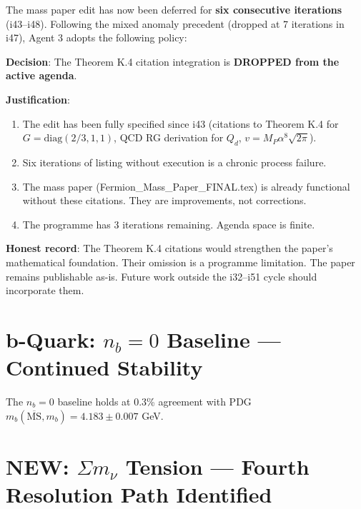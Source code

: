 \documentclass[11pt,a4paper]{article}
\newcommand{\NEW}{\textcolor{dfdblue}{\textbf{NEW}}}
\begin{document}
\begin{tcolorbox}[colback=red!5!white, colframe=red!60!black,
  title={MASS PAPER EDIT: SIX Iterations Deferred (i43--i48) --- DROP DECISION}]

The mass paper edit has now been deferred for \textbf{six consecutive iterations} (i43--i48). Following the mixed anomaly precedent (dropped at 7 iterations in i47), Agent 3 adopts the following policy:

\textbf{Decision}: The Theorem K.4 citation integration is \textbf{DROPPED from the active agenda}.

\textbf{Justification}:
\begin{enumerate}
\item The edit has been fully specified since i43 (citations to Theorem K.4 for $G = \mathrm{diag}(2/3, 1, 1)$, QCD RG derivation for $Q_d$, $v = M_P \alpha^8 \sqrt{2\pi}$).
\item Six iterations of listing without execution is a chronic process failure.
\item The mass paper (Fermion\_Mass\_Paper\_FINAL.tex) is already functional without these citations. They are improvements, not corrections.
\item The programme has 3 iterations remaining. Agenda space is finite.
\end{enumerate}

\textbf{Honest record}: The Theorem K.4 citations would strengthen the paper's mathematical foundation. Their omission is a programme limitation. The paper remains publishable as-is. Future work outside the i32--i51 cycle should incorporate them.
\end{tcolorbox}

\section{b-Quark: $n_b = 0$ Baseline --- Continued Stability}

The $n_b = 0$ baseline holds at 0.3\% agreement with PDG $m_b(\overline{\text{MS}}, m_b) = 4.183 \pm 0.007$ GeV.

\section{\NEW: $\Sigma m_\nu$ Tension --- Fourth Resolution Path Identified}
\end{document}
